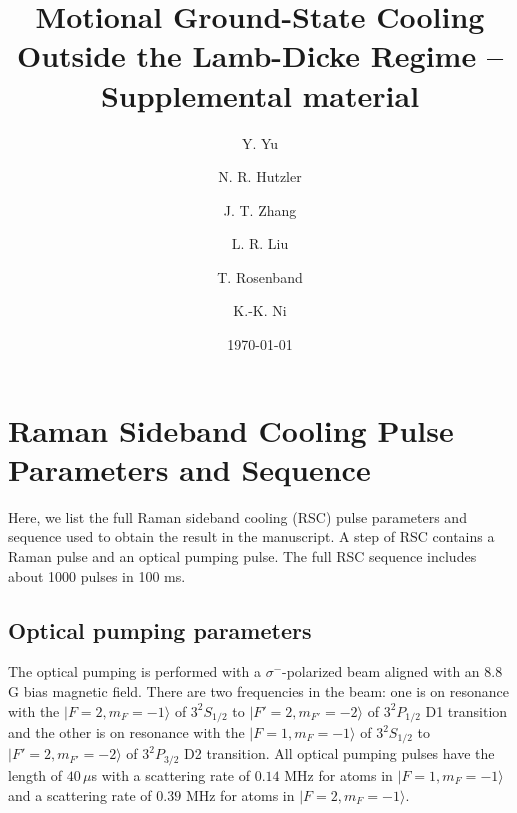 \documentclass[aps,secnumarabic,amsmath,amssymb]{revtex4}
\begin{document}
\title{Motional Ground-State Cooling Outside the Lamb-Dicke Regime -- Supplemental material}
\author{Y. Yu}
\author{N. R. Hutzler}
\author{J. T. Zhang}
\author{L. R. Liu}
\author{T. Rosenband}
\author{K.-K. Ni}

\date{\today}

\maketitle

\section{Raman Sideband Cooling Pulse Parameters and Sequence}
Here, we list the full Raman sideband cooling (RSC) pulse parameters and sequence used to obtain the result in the manuscript.
A step of RSC contains a Raman pulse and an optical pumping pulse.
The full RSC sequence includes about 1000 pulses in 100 ms.

\subsection{Optical pumping parameters}
The optical pumping is performed with a $\sigma^-$-polarized beam aligned with an 8.8 G bias magnetic field.
There are two frequencies in the beam: one is on resonance with
the $|F=2,m_F=-1\rangle$ of $3^2S_{1/2}$ to $|F'=2,m_{F'}=-2\rangle$ of $3^2P_{1/2}$ D1 transition
and the other is on resonance with the $|F=1,m_F=-1\rangle$ of $3^2S_{1/2}$ to $|F'=2,m_{F'}=-2\rangle$ of $3^2P_{3/2}$ D2 transition.
All optical pumping pulses have the length of $40\,\mu$s
with a scattering rate of $0.14$ MHz for atoms in $|F=1,m_F=-1\rangle$
and a scattering rate of $0.39$ MHz for atoms in $|F=2,m_F=-1\rangle$.
\end{document}
